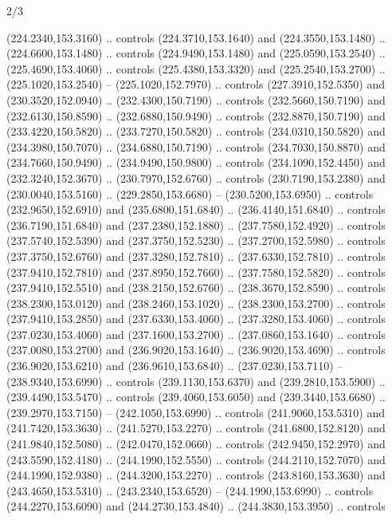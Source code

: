 \begin{flagdescription}{2/3}
\begin{scope}[xshift=0.5\flaglength,yshift=0.5\flagwidth,scale=\flagwidth/259.2]
\begin{scope}[y=0.8pt, x=0.8pt, yscale=-1,shift={(-243,-162)}]
      (224.2340,153.3160) .. controls (224.3710,153.1640) and (224.3550,153.1480) ..
      (224.6600,153.1480) .. controls (224.9490,153.1480) and (225.0590,153.2540) ..
      (225.4690,153.4060) .. controls (225.4380,153.3320) and (225.2540,153.2700) ..
      (225.1020,153.2540) -- (225.1020,152.7970) .. controls (227.3910,152.5350) and
      (230.3520,152.0940) .. (232.4300,150.7190) .. controls (232.5660,150.7190) and
      (232.6130,150.8590) .. (232.6880,150.9490) .. controls (232.8870,150.7190) and
      (233.4220,150.5820) .. (233.7270,150.5820) .. controls (234.0310,150.5820) and
      (234.3980,150.7070) .. (234.6880,150.7190) .. controls (234.7030,150.8870) and
      (234.7660,150.9490) .. (234.9490,150.9800) .. controls (234.1090,152.4450) and
      (232.3240,152.3670) .. (230.7970,152.6760) .. controls (230.7190,153.2380) and
      (230.0040,153.5160) .. (229.2850,153.6680) -- (230.5200,153.6950) .. controls
      (232.9650,152.6910) and (235.6800,151.6840) .. (236.4140,151.6840) .. controls
      (236.7190,151.6840) and (237.2380,152.1880) .. (237.7580,152.4920) .. controls
      (237.5740,152.5390) and (237.3750,152.5230) .. (237.2700,152.5980) .. controls
      (237.3750,152.6760) and (237.3280,152.7810) .. (237.6330,152.7810) .. controls
      (237.9410,152.7810) and (237.8950,152.7660) .. (237.7580,152.5820) .. controls
      (237.9410,152.5510) and (238.2150,152.6760) .. (238.3670,152.8590) .. controls
      (238.2300,153.0120) and (238.2460,153.1020) .. (238.2300,153.2700) .. controls
      (237.9410,153.2850) and (237.6330,153.4060) .. (237.3280,153.4060) .. controls
      (237.0230,153.4060) and (237.1600,153.2700) .. (237.0860,153.1640) .. controls
      (237.0080,153.2700) and (236.9020,153.1640) .. (236.9020,153.4690) .. controls
      (236.9020,153.6210) and (236.9610,153.6840) .. (237.0230,153.7110) --
      (238.9340,153.6990) .. controls (239.1130,153.6370) and (239.2810,153.5900) ..
      (239.4490,153.5470) .. controls (239.4060,153.6050) and (239.3440,153.6680) ..
      (239.2970,153.7150) -- (242.1050,153.6990) .. controls (241.9060,153.5310) and
      (241.7420,153.3630) .. (241.5270,153.2270) .. controls (241.6800,152.8120) and
      (241.9840,152.5080) .. (242.0470,152.0660) .. controls (242.9450,152.2970) and
      (243.5590,152.4180) .. (244.1990,152.5550) .. controls (244.2110,152.7070) and
      (244.1990,152.9380) .. (244.3200,153.2270) .. controls (243.8160,153.3630) and
      (243.4650,153.5310) .. (243.2340,153.6520) -- (244.1990,153.6990) .. controls
      (244.2270,153.6090) and (244.2730,153.4840) .. (244.3830,153.3950) .. controls

\end{scope}
\end{scope}
\end{flagdescription}
